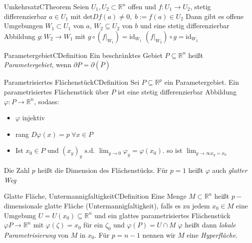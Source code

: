 \begin{ibox}[50]{Umkehrsatz}{CTheorem}
	Seien $ U_1, U_2 \subset \mathbb{R}^n $ offen und $ f : U_1 \to U_2$, stetig differenzierbar $ a \in U_1 $ mit $ \text{det} Df (a) 
	\neq 0, \; b := f (a) \in U_2 $ Dann gibt es offene Umgebungen $ W_1 \subset U_1 $ von $ a $, $ W_2 \subseteq U_2 $ von $ b $ 
	und eine stetig differenzierbar Abbildung $ g: W_2 \to W_1 $ mit $ g \circ \left( f | _{W_1} \right) = \text{id}_{W_1}  $ 
 $  \left( f | _{W_2} \right) \circ g = \text{id}_{W_2} $ 
\end{ibox}

\begin{ibox}[]{Parametergebiet}{CDefinition}
	Ein beschränktes Gebiet $ P \subseteq \mathbb{R}^n  $ heißt \textit{Parametergebiet}, wenn $ \partial P = \partial ( \overline{P}) $ 
\end{ibox}

\begin{ibox}[]{Parametrisiertes Flächenstück}{CDefinition}
    Sei $ P \subseteq \mathbb{R}^p $ ein Parametergebiet. Ein parametrisiertes Flächenstück über $ P $ ist eine stetig 
		differenzierbar Abbildung $ \varphi : P \to \mathbb{R}^n  $, sodass: 
		\begin{itemize}
			\item $ \varphi  $ injektiv
			\item rang $ D \varphi (x) = p \; \forall x \in  P$ 
			\item Ist $ x_0 \in P \text{ und }  \left( x_{y} \right)_{y} \text{ s.d. } \lim_{ y \to 0} \varphi_{y} = \varphi (x_0) $.
				so ist $ \lim_{ y \to \infty x_{y} = x_0}  $ 
		\end{itemize}
	Die Zahl $ p $ heißt die Dimension des Flächenstücks. Für $ p = 1 $ heißt $ \varphi  $ auch \textit{glatter Weg} 	
\end{ibox}

\begin{ibox}[]{Glatte Fläche, Untermannigfaltigkeit}{CDefinition}
    Eine Menge $ M \subset \mathbb{R}^n  $ heißt $ p- $dimensionale glatte Fläche (Untermannigfaltigkeit), falls es zu jedem 
		$ x_0 \in M $ eine Umgebung $ U = U (x_0) \subseteq \mathbb{R}^n  $ und ein glattes parametrisiertes Flächenstück 
		$ \varphi P \to \mathbb{R}^n  $ mit $ \varphi (\zeta) = x_0 $ für ein $ \zeta_0 $ und $ \varphi (P) = U \cap M $ $ \varphi  $ heißt
		dann \textit{lokale Parametrisierung} von $ M $ in $ x_0 $. Für $ p = n-1 $ nennen wir $ M $ eine \textit{Hyperfläche}.
\end{ibox}

